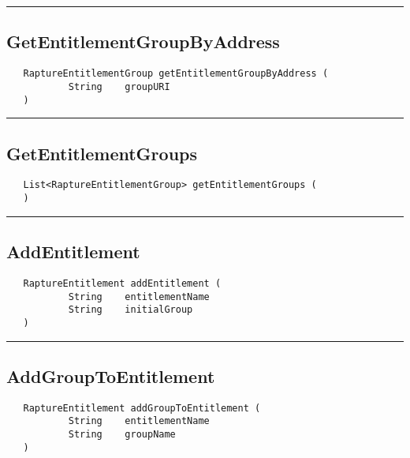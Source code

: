 \rule{15cm}{2pt}
\subsection{GetEntitlementGroupByAddress}
\label{Api:GetEntitlementGroupByAddress}
\begin{verbatim}
   RaptureEntitlementGroup getEntitlementGroupByAddress (
           String    groupURI
   )
\end{verbatim}



\rule{15cm}{2pt}
\subsection{GetEntitlementGroups}
\label{Api:GetEntitlementGroups}
\begin{verbatim}
   List<RaptureEntitlementGroup> getEntitlementGroups (
   )
\end{verbatim}



\rule{15cm}{2pt}
\subsection{AddEntitlement}
\label{Api:AddEntitlement}
\begin{verbatim}
   RaptureEntitlement addEntitlement (
           String    entitlementName
           String    initialGroup
   )
\end{verbatim}



\rule{15cm}{2pt}
\subsection{AddGroupToEntitlement}
\label{Api:AddGroupToEntitlement}
\begin{verbatim}
   RaptureEntitlement addGroupToEntitlement (
           String    entitlementName
           String    groupName
   )
\end{verbatim}



